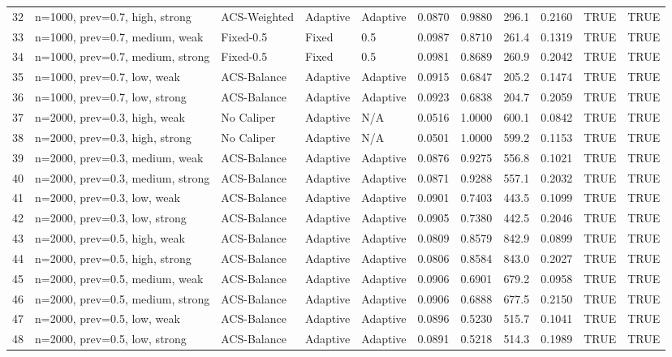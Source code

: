 \begin{tabular}{rllllllllll}
32 & n=1000, prev=0.7, high, strong & ACS-Weighted & Adaptive & Adaptive & 0.0870 & 0.9880 & 296.1 & 0.2160 & TRUE & TRUE \\
33 & n=1000, prev=0.7, medium, weak & Fixed-0.5 & Fixed & 0.5 & 0.0987 & 0.8710 & 261.4 & 0.1319 & TRUE & TRUE \\
34 & n=1000, prev=0.7, medium, strong & Fixed-0.5 & Fixed & 0.5 & 0.0981 & 0.8689 & 260.9 & 0.2042 & TRUE & TRUE \\
35 & n=1000, prev=0.7, low, weak & ACS-Balance & Adaptive & Adaptive & 0.0915 & 0.6847 & 205.2 & 0.1474 & TRUE & TRUE \\
36 & n=1000, prev=0.7, low, strong & ACS-Balance & Adaptive & Adaptive & 0.0923 & 0.6838 & 204.7 & 0.2059 & TRUE & TRUE \\
37 & n=2000, prev=0.3, high, weak & No Caliper & Adaptive & N/A & 0.0516 & 1.0000 & 600.1 & 0.0842 & TRUE & TRUE \\
38 & n=2000, prev=0.3, high, strong & No Caliper & Adaptive & N/A & 0.0501 & 1.0000 & 599.2 & 0.1153 & TRUE & TRUE \\
39 & n=2000, prev=0.3, medium, weak & ACS-Balance & Adaptive & Adaptive & 0.0876 & 0.9275 & 556.8 & 0.1021 & TRUE & TRUE \\
40 & n=2000, prev=0.3, medium, strong & ACS-Balance & Adaptive & Adaptive & 0.0871 & 0.9288 & 557.1 & 0.2032 & TRUE & TRUE \\
41 & n=2000, prev=0.3, low, weak & ACS-Balance & Adaptive & Adaptive & 0.0901 & 0.7403 & 443.5 & 0.1099 & TRUE & TRUE \\
42 & n=2000, prev=0.3, low, strong & ACS-Balance & Adaptive & Adaptive & 0.0905 & 0.7380 & 442.5 & 0.2046 & TRUE & TRUE \\
43 & n=2000, prev=0.5, high, weak & ACS-Balance & Adaptive & Adaptive & 0.0809 & 0.8579 & 842.9 & 0.0899 & TRUE & TRUE \\
44 & n=2000, prev=0.5, high, strong & ACS-Balance & Adaptive & Adaptive & 0.0806 & 0.8584 & 843.0 & 0.2027 & TRUE & TRUE \\
45 & n=2000, prev=0.5, medium, weak & ACS-Balance & Adaptive & Adaptive & 0.0906 & 0.6901 & 679.2 & 0.0958 & TRUE & TRUE \\
46 & n=2000, prev=0.5, medium, strong & ACS-Balance & Adaptive & Adaptive & 0.0906 & 0.6888 & 677.5 & 0.2150 & TRUE & TRUE \\
47 & n=2000, prev=0.5, low, weak & ACS-Balance & Adaptive & Adaptive & 0.0896 & 0.5230 & 515.7 & 0.1041 & TRUE & TRUE \\
48 & n=2000, prev=0.5, low, strong & ACS-Balance & Adaptive & Adaptive & 0.0891 & 0.5218 & 514.3 & 0.1989 & TRUE & TRUE \\

\end{tabular}
